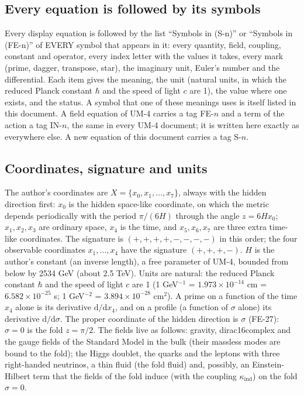\documentclass[
  10pt,
]{article}
\begin{document}
\hypertarget{every-equation-is-followed-by-its-symbols}{%
\subsection{Every equation is followed by its
symbols}\label{every-equation-is-followed-by-its-symbols}}

Every display equation is followed by the list ``Symbols in (S-n)'' or
``Symbols in (FE-n)'' of EVERY symbol that appears in it: every
quantity, field, coupling, constant and operator, every index letter
with the values it takes, every mark (prime, dagger, transpose, star),
the imaginary unit, Euler's number and the differential. Each item gives
the meaning, the unit (natural units, in which the reduced Planck
constant \(\hbar\) and the speed of light \(c\) are 1), the value where
one exists, and the status. A symbol that one of these meanings uses is
itself listed in this document. A field equation of UM-4 carries a tag
FE-\(n\) and a term of the action a tag IN-\(n\), the same in every UM-4
document; it is written here exactly as everywhere else. A new equation
of this document carries a tag S-\(n\).

\hypertarget{coordinates-signature-and-units}{%
\subsection{Coordinates, signature and
units}\label{coordinates-signature-and-units}}

The author's coordinates are \(X = \{x_0, x_1, \dots, x_7\}\), always
with the hidden direction first: \(x_0\) is the hidden space-like
coordinate, on which the metric depends periodically with the period
\(\pi/(6H)\) through the angle \(z = 6Hx_0\); \(x_1, x_2, x_3\) are
ordinary space, \(x_4\) is the time, and \(x_5, x_6, x_7\) are three
extra time-like coordinates. The signature is \((+,+,+,+,-,-,-,-)\) in
this order; the four observable coordinates \(x_1, \dots, x_4\) have the
signature \((+,+,+,-)\). \(H\) is the author's constant (an inverse
length), a free parameter of UM-4, bounded from below by 2534 GeV (about
2.5 TeV). Units are natural: the reduced Planck constant \(\hbar\) and
the speed of light \(c\) are 1 (1 GeV\(^{-1}\) = \(1.973\times10^{-14}\)
cm = \(6.582\times10^{-25}\) s; 1 GeV\(^{-2}\) = \(3.894\times10^{-28}\)
cm\(^2\)). A prime on a function of the time \(x_4\) alone is its
derivative \(\mathrm{d}/\mathrm{d}x_4\), and on a profile (a function of
\(\sigma\) alone) its derivative \(\mathrm{d}/\mathrm{d}\sigma\). The
proper coordinate of the hidden direction is \(\sigma\) (FE-27):
\(\sigma = 0\) is the fold \(z = \pi/2\). The fields live as follows:
gravity, dirac16complex and the gauge fields of the Standard Model in
the bulk (their massless modes are bound to the fold); the Higgs
doublet, the quarks and the leptons with three right-handed neutrinos, a
thin fluid (the fold fluid) and, possibly, an Einstein-Hilbert term that
the fields of the fold induce (with the coupling
\(\kappa_{\mathrm{ind}}\)) on the fold \(\sigma = 0\).
\end{document}
